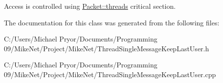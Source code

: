 Access is controlled using \hyperlink{class_thread_single_message_keep_last_user_a63c547a8951cede4c6a9bbd69688980d}{Packet::threads} critical section. 

The documentation for this class was generated from the following files:\begin{DoxyCompactItemize}
\item 
C:/Users/Michael Pryor/Documents/Programming 09/MikeNet/Project/MikeNet/ThreadSingleMessageKeepLastUser.h\item 
C:/Users/Michael Pryor/Documents/Programming 09/MikeNet/Project/MikeNet/ThreadSingleMessageKeepLastUser.cpp\end{DoxyCompactItemize}
